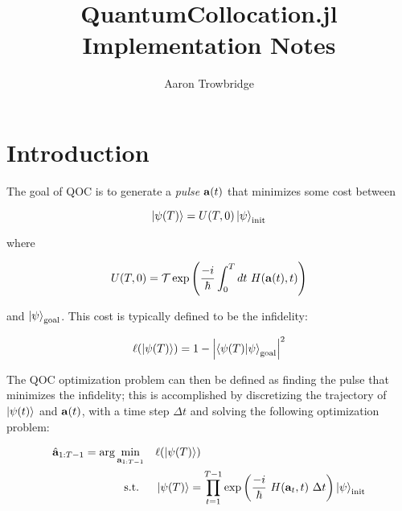 \documentclass{article}
\title{QuantumCollocation.jl Implementation Notes}
\author{Aaron Trowbridge}
\date{}
\begin{document}
\maketitle



\tableofcontents

\newpage


\section{Introduction}

The goal of QOC is to generate a \textit{pulse} $\vb{a}(t)$ that minimizes some cost between 

\begin{equation} 
  \ket{\psi(T)} = U(T, 0) \ket{\psi}_{\text{init}}
\end{equation}

where

\begin{equation}
  U(T, 0) = \mathcal{T} \exp \qty( \frac{-i}{\hbar} \int_0^T dt \ H(\vb{a}(t), t)) 
\end{equation}

and $\ket{\psi}_{\text{goal}}$. This cost is typically defined to be the infidelity:

\begin{equation}
  \ell \qty(\ket{\psi(T)}) = 1 - \abs{\bra{\psi(T)} \ket{\psi}_{\text{goal}}}^2
\end{equation}

The QOC optimization problem can then be defined as finding the pulse that minimizes the infidelity; this is accomplished by discretizing the trajectory of $\ket{\psi(t)}$ and $\vb{a}(t)$, with a time step $\Delta t$ and solving the following optimization problem:

\begin{align*}
  \hat{\vb{a}}_{1:T-1} = \arg \min_{\vb{a}_{1:T-1}} \quad &\ell \qty(\ket{\psi(T)})\\
  \text{s.t. } \quad 
    & \ket{\psi(T)} = \prod_{t=1}^{T-1} \exp \qty( \frac{-i}{\hbar} \ H(\vb{a}_t, t) \ \Delta t) \ket{\psi}_{\text{init}} \\
\end{align*}
\end{document}
